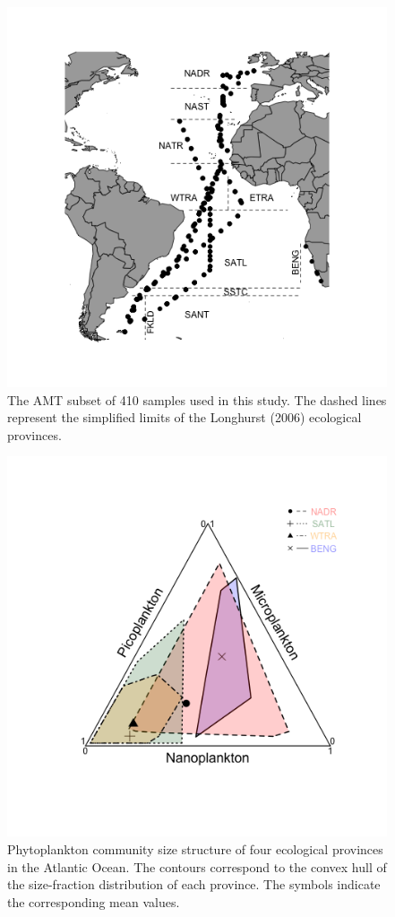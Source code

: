 
\begin{figure}
\centering
\includegraphics[trim = 30mm 20mm 25mm 20mm, clip, width=0.5\linewidth]{./Chp2-Pre/amt_mapFINAL2.png}
\caption[Scheme]{\small {The AMT subset of 410 samples used in this study. The dashed lines represent the simplified limits of the Longhurst (2006) ecological provinces.}}
\label{Map}
\end{figure}

\begin{figure}
\centering
\includegraphics[trim = 20mm 30mm 20mm 20mm, clip, width=0.6\linewidth]{./Chp2-Pre/amt_4RegionsTriSizeFrac4.png}
\caption[Scheme]{\small {Phytoplankton community size structure of four ecological provinces in the Atlantic Ocean. The contours correspond to the convex hull of the size-fraction distribution of each province. The symbols indicate the corresponding mean values.}}
\label{RegSizeFrac}
\end{figure}

